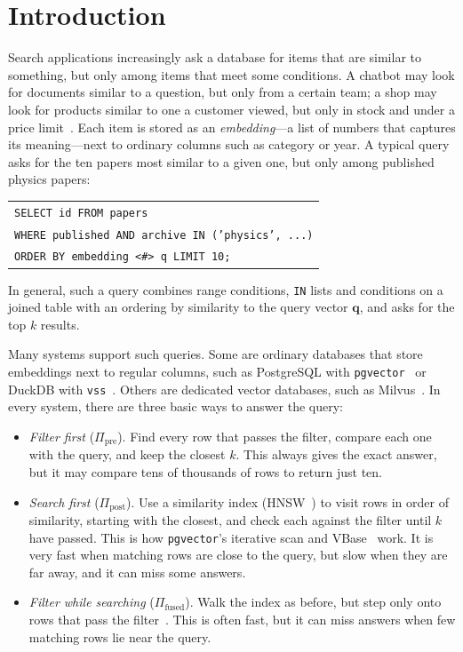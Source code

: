 \documentclass[sigconf, nonacm]{acmart}
\newcommand{\Ppre}{\Pi_{\text{pre}}}
\newcommand{\Pfus}{\Pi_{\text{fused}}}
\newcommand{\Ppost}{\Pi_{\text{post}}}
\begin{document}
\section{Introduction}\label{sec:intro}
Search applications increasingly ask a database for items that are similar to something, but only among items that meet some conditions. A chatbot may look for documents similar to a question, but only from a certain team; a shop may look for products similar to one a customer viewed, but only in stock and under a price limit~\cite{wei2020analyticdbv,zhang2023vbase,patel2024acorn,amanbayev2026fanns}. Each item is stored as an \emph{embedding}---a list of numbers that captures its meaning---next to ordinary columns such as category or year. A typical query asks for the ten papers most similar to a given one, but only among published physics papers:
\begin{center}
\footnotesize
\begin{tabular}{@{}l@{}}
\texttt{SELECT id FROM papers}\\
\texttt{WHERE published AND archive IN ('physics', ...)}\\
\texttt{ORDER BY embedding <\#> q LIMIT 10;}
\end{tabular}
\end{center}
In general, such a query combines range conditions, \texttt{IN} lists and conditions on a joined table with an ordering by similarity to the query vector $\mathbf{q}$, and asks for the top $k$ results.

Many systems support such queries. Some are ordinary databases that store embeddings next to regular columns, such as PostgreSQL with \texttt{pgvector}~\cite{pgvector2024} or DuckDB with \texttt{vss}~\cite{duckdbvss2024}. Others are dedicated vector databases, such as Milvus~\cite{wang2021milvus}. In every system, there are three basic ways to answer the query:
\begin{itemize}
    \item \emph{Filter first} ($\Ppre$). Find every row that passes the filter, compare each one with the query, and keep the closest $k$. This always gives the exact answer, but it may compare tens of thousands of rows to return just ten.
    \item \emph{Search first} ($\Ppost$). Use a similarity index (HNSW~\cite{malkov2018hnsw}) to visit rows in order of similarity, starting with the closest, and check each against the filter until $k$ have passed. This is how \texttt{pgvector}'s iterative scan and VBase~\cite{zhang2023vbase} work. It is very fast when matching rows are close to the query, but slow when they are far away, and it can miss some answers.
    \item \emph{Filter while searching} ($\Pfus$). Walk the index as before, but step only onto rows that pass the filter~\cite{patel2024acorn,wang2021milvus}. This is often fast, but it can miss answers when few matching rows lie near the query.
\end{itemize}
\end{document}
